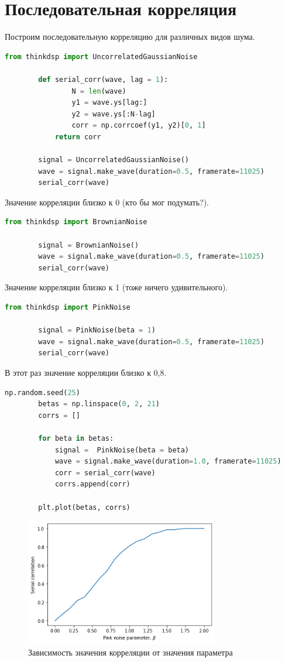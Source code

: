 \documentclass[a4paper, 12pt]{report}
\begin{document}
	\chapter{Последовательная корреляция}
	Построим последовательную корреляцию для различных видов шума.
	\begin{lstlisting}[language=Python,caption=Некоррелированный шум]
		from thinkdsp import UncorrelatedGaussianNoise		

		def serial_corr(wave, lag = 1):
    			N = len(wave)
    			y1 = wave.ys[lag:]
    			y2 = wave.ys[:N-lag]
    			corr = np.corrcoef(y1, y2)[0, 1]
			return corr
				
		signal = UncorrelatedGaussianNoise()
		wave = signal.make_wave(duration=0.5, framerate=11025)
		serial_corr(wave)
	\end{lstlisting}
	Значение корреляции близко к 0 (кто бы мог подумать?).
	\begin{lstlisting}[language=Python,caption=Броуновский шум]
		from thinkdsp import BrownianNoise

		signal = BrownianNoise()
		wave = signal.make_wave(duration=0.5, framerate=11025)
		serial_corr(wave)
	\end{lstlisting}
	Значение корреляции близко к 1 (тоже ничего удивительного).
	\begin{lstlisting}[language=Python,caption=Розовый шум]
		from thinkdsp import PinkNoise

		signal = PinkNoise(beta = 1)
		wave = signal.make_wave(duration=0.5, framerate=11025)
		serial_corr(wave)
	\end{lstlisting}
	В этот раз значение корреляции близко к 0,8.
	\begin{lstlisting}[language=Python,caption=Немного более подробно изучим Розовый шум]
		np.random.seed(25)
		betas = np.linspace(0, 2, 21)
		corrs = []

		for beta in betas:
			signal =  PinkNoise(beta = beta)
			wave = signal.make_wave(duration=1.0, framerate=11025)
			corr = serial_corr(wave)
			corrs.append(corr)
    
		plt.plot(betas, corrs)
	\end{lstlisting}
	\begin{figure}[H]
		\centering
		\includegraphics[width=0.75\textwidth]{beta1.png}
		\caption{Зависимость значения корреляции от значения параметра}
		\label{fig:beta1}
	\end{figure}
\end{document}
